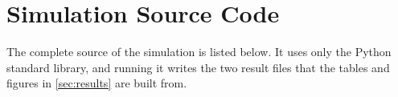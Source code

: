
\section{Simulation Source Code}
\label{app:source}

The complete source of the simulation is listed below. It uses only the
Python standard library, and running it writes the two result files that the
tables and figures in \cref{sec:results} are built from.


